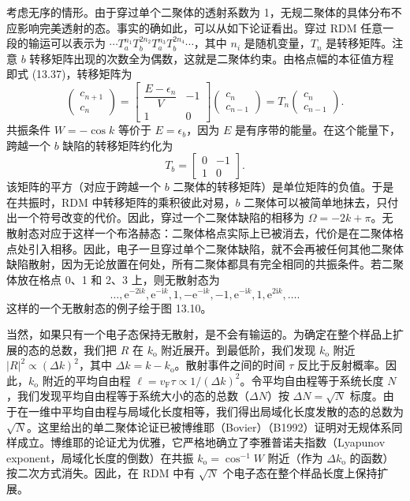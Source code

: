 考虑无序的情形。由于穿过单个二聚体的透射系数为 1，无规二聚体的具体分布不应影响完美透射的态。事实的确如此，可以从如下论证看出。穿过 RDM 任意一段的输运可以表示为 $\cdots T_{a}^{n_{1}}T_{b}^{2n_{2}}T_{a}^{n_{3}}T_{b}^{2n_{4}}\cdots$，其中 $n_{i}$ 是随机变量，$T_{n}$ 是转移矩阵。注意 $b$ 转移矩阵出现的次数全为偶数，这就是二聚体约束。由格点幅的本征值方程即式 (13.37)，转移矩阵为
\begin{equation*}
\begin{pmatrix} c_{n+1}\\ c_{n}\end{pmatrix}=\begin{bmatrix}\dfrac{E-\epsilon_{n}}{V} & -1\\[4pt] 1 & 0\end{bmatrix}\begin{pmatrix} c_{n}\\ c_{n-1}\end{pmatrix}=T_{n}\begin{pmatrix} c_{n}\\ c_{n-1}\end{pmatrix}.\tag{13.42}
\end{equation*}
共振条件 $W=-\cos k$ 等价于 $E=\epsilon_{b}$，因为 $E$ 是有序带的能量。在这个能量下，跨越一个 $b$ 缺陷的转移矩阵约化为
\begin{equation*}
T_{b}=\begin{bmatrix} 0 & -1\\ 1 & 0\end{bmatrix}.\tag{13.43}
\end{equation*}
该矩阵的平方（对应于跨越一个 $b$ 二聚体的转移矩阵）是单位矩阵的负值。于是在共振时，RDM 中转移矩阵的乘积彼此对易，$b$ 二聚体可以被简单地抹去，只付出一个符号改变的代价。因此，穿过一个二聚体缺陷的相移为 $\Omega=-2k+\pi$。无散射态对应于这样一个布洛赫态：二聚体格点实际上已被消去，代价是在二聚体格点处引入相移。因此，电子一旦穿过单个二聚体缺陷，就不会再被任何其他二聚体缺陷散射，因为无论放置在何处，所有二聚体都具有完全相同的共振条件。若二聚体放在格点 0、1 和 2、3 上，则无散射态为
\begin{equation*}
\ldots,\mathrm{e}^{-2\mathrm{i}k},\mathrm{e}^{-\mathrm{i}k},1,-\mathrm{e}^{-\mathrm{i}k},-1,\mathrm{e}^{-\mathrm{i}k},1,\mathrm{e}^{2\mathrm{i}k},\ldots.\tag{13.44}
\end{equation*}
这样的一个无散射态的例子绘于图 13.10。

当然，如果只有一个电子态保持无散射，是不会有输运的。为确定在整个样品上扩展的态的总数，我们把 $R$ 在 $k_{\mathrm{o}}$ 附近展开。到最低阶，我们发现 $k_{\mathrm{o}}$ 附近 $|R|^{2}\propto(\Delta k)^{2}$，其中 $\Delta k=k-k_{\mathrm{o}}$。散射事件之间的时间 $\tau$ 反比于反射概率。因此，$k_{\mathrm{o}}$ 附近的平均自由程 $\ell=v_{\mathrm{F}}\tau\propto 1/(\Delta k)^{2}$。令平均自由程等于系统长度 $N$，我们发现平均自由程等于系统大小的态的总数（$\Delta N$）按 $\Delta N=\sqrt{N}$ 标度。由于在一维中平均自由程与局域化长度相等，我们得出局域化长度发散的态的总数为 $\sqrt{N}$。这里给出的单二聚体论证已被博维耶（Bovier）（B1992）证明对无规体系同样成立。博维耶的论证尤为优雅，它严格地确立了李雅普诺夫指数（Lyapunov exponent，局域化长度的倒数）在共振 $k_{\mathrm{o}}=\cos^{-1}W$ 附近（作为 $\Delta k_{\mathrm{o}}$ 的函数）按二次方式消失。因此，在 RDM 中有 $\sqrt{N}$ 个电子态在整个样品长度上保持扩展。

